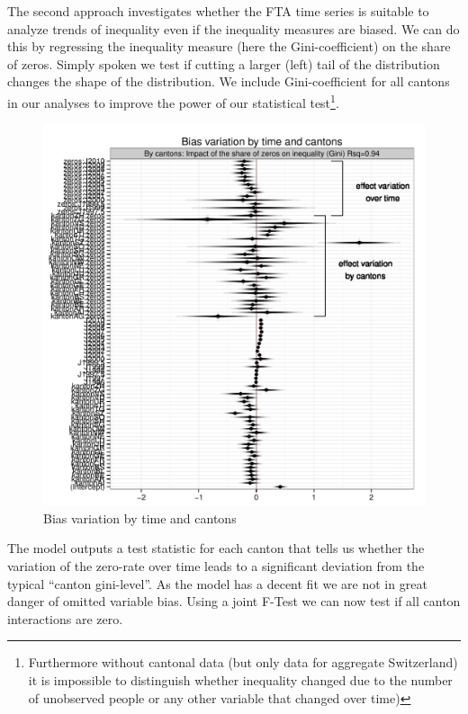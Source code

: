 \documentclass[twoside]{article}\usepackage[]{graphicx}\usepackage[]{color}
\makeatletter
\def\maxwidth{ %
  \ifdim\Gin@nat@width>\linewidth
    \linewidth
  \else
    \Gin@nat@width
  \fi
}
\newenvironment{knitrout}{}{} %
\makeatother
\begin{document}
\begin{multicols}{2}
The second approach investigates whether the FTA time series is suitable to analyze trends of inequality even if the inequality measures are biased. We can do this by regressing the inequality measure (here the Gini-coefficient) on the share of zeros. Simply spoken we test if cutting a larger (left) tail of the distribution changes the shape of the distribution. We include Gini-coefficient for all cantons in our analyses to improve the power of our statistical test\footnote{Furthermore without cantonal data (but only data for aggregate Switzerland) it is impossible to distinguish whether inequality changed due to the number of unobserved people or any other variable that changed over time)}. 

\begin{knitrout}
\color{fgcolor}\begin{figure}[H]

\includegraphics[width=\maxwidth]{figure/corrected_gini} \caption[Bias variation by time and cantons]{Bias variation by time and cantons\label{fig:corrected_gini}}
\end{figure}


\end{knitrout}

The model outputs a test statistic for each canton that tells us whether the variation of the zero-rate over time leads to a significant deviation from the typical ``canton gini-level''. As the model has a decent fit we are not in great danger of omitted variable bias. Using a joint F-Test we can now test if all canton interactions are zero. 




\end{multicols}
\end{document}
